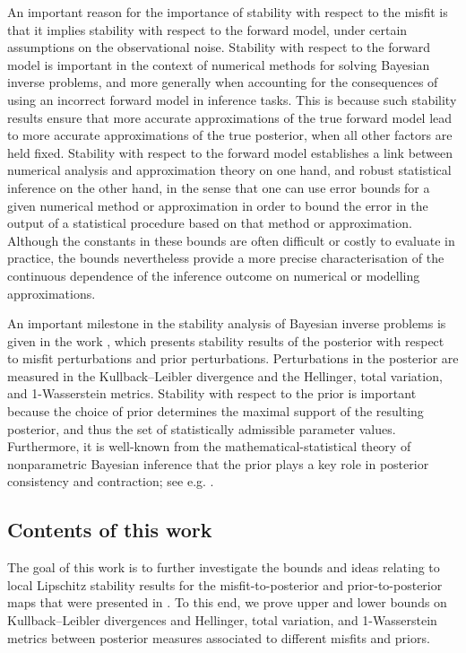 \documentclass[a4paper]{scrartcl}
\theoremstyle{definition}
\numberwithin{equation}{section}
\begin{document}
An important reason for the importance of stability with respect to the misfit is that it implies stability with respect to the forward model, under certain assumptions on the observational noise.
Stability with respect to the forward model is important in the context of numerical methods for solving Bayesian inverse problems, and more generally when accounting for the consequences of using an incorrect forward model in inference tasks.
This is because such stability results ensure that more accurate approximations of the true forward model lead to more accurate approximations of the true posterior, when all other factors are held fixed. 
Stability with respect to the forward model establishes a link between numerical analysis and approximation theory on one hand, and robust statistical inference on the other hand, in the sense that one can use error bounds for a given numerical method or approximation in order to bound the error in the output of a statistical procedure based on that method or approximation.
Although the constants in these bounds are often difficult or costly to evaluate in practice, the bounds nevertheless provide a more precise characterisation of the continuous dependence of the inference outcome on numerical or modelling approximations.

An important milestone in the stability analysis of Bayesian inverse problems is given in the work \cite{Sprungk2020}, which presents stability results of the posterior with respect to misfit perturbations and prior perturbations. Perturbations in the posterior are measured in the Kullback--Leibler divergence and the Hellinger, total variation, and 1-Wasserstein metrics.
Stability with respect to the prior is important because the choice of prior determines the maximal support of the resulting posterior, and thus the set of statistically admissible parameter values.
Furthermore, it is well-known from the mathematical-statistical theory of nonparametric Bayesian inference that the prior plays a key role in posterior consistency and contraction; see e.g. \cite[Chapter 6]{GhosalvanderVaart2017}.

\subsection{Contents of this work}
\label{section_contents}

The goal of this work is to further investigate the bounds and ideas relating to local Lipschitz stability results for the misfit-to-posterior and prior-to-posterior maps that were presented in \cite{Sprungk2020}.
To this end, we prove upper and lower bounds on Kullback--Leibler divergences and Hellinger, total variation, and 1-Wasserstein metrics between posterior measures associated to different misfits and priors.
\end{document}
